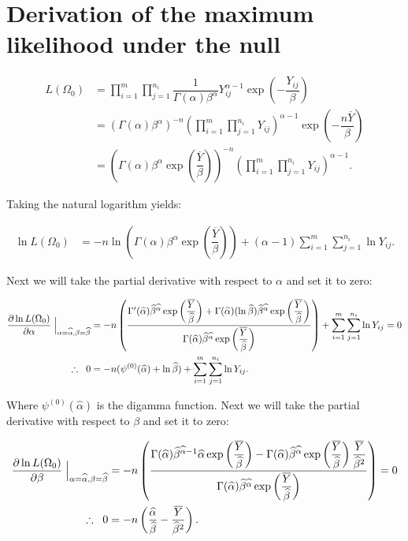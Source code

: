 \documentclass[12pt,a4paper,openright]{article}
\newcommand{\ovY}{\overline{Y}}
\newcommand{\wal}{\widehat{\alpha}}
\newcommand{\wbe}{\widehat{\beta}}
\newcommand{\expy}{\exp\left(\dfrac{\overline{Y}}{\wbe}\right)}
\begin{document}
	\section{Derivation of the maximum likelihood under the null}
	\begin{align}
		L(\Omega_0) &= \prod_{i=1}^m \prod_{j=1}^{n_i} \dfrac{1}{\Gamma(\alpha)\beta^{\alpha}} Y_{ij}^{\alpha-1} \exp{\left(-\dfrac{Y_{ij}}{\beta}\right)} \nonumber \\
		&= (\Gamma(\alpha)\beta^{\alpha})^{-n} \left(\prod_{i=1}^m \prod_{j=1}^{n_i} Y_{ij}\right)^{\alpha-1} \exp{\left(-\dfrac{n\overline{Y}}{\beta}\right)} \nonumber \\
		&= \left(\Gamma(\alpha)\beta^{\alpha}\exp\left(\dfrac{\overline{Y}}{\beta}\right)\right)^{-n} \left(\prod_{i=1}^m \prod_{j=1}^{n_i} Y_{ij}\right)^{\alpha-1}. \label{LikNull}
	\end{align}

	Taking the natural logarithm yields:
	
	\begin{align*}
		\ln{L(\Omega_0)} &= -n\ln{\left(\Gamma(\alpha)\beta^{\alpha}\exp\left(\dfrac{\overline{Y}}{\beta}\right)\right)} + (\alpha-1)\sum_{i=1}^m \sum_{j=1}^{n_i} \ln{Y_{ij}}.
	\end{align*}

	Next we will take the partial derivative with respect to $\alpha$ and set it to zero:
	
	\begin{align}
		\dfrac{\partial \ln{L(\Omega_0)}}{\partial \alpha} \Bigm\lvert_{\alpha=\widehat{\alpha}, \beta=\widehat{\beta}} &= -n \left(\dfrac{\Gamma'(\wal)\wbe^{\wal}\exp\left(\dfrac{\overline{Y}}{\wbe}\right) + \Gamma(\wal)(\ln{\wbe})\wbe^{\wal}\exp\left(\dfrac{\overline{Y}}{\wbe}\right)}{\Gamma(\wal)\wbe^{\wal}\exp\left(\dfrac{\overline{Y}}{\wbe}\right)}\right) + \sum_{i=1}^{m} \sum_{j=1}^{n_i} \ln{Y_{ij}} =0 \nonumber \\
		\therefore\hspace{0.2cm} 0 &= -n(\psi^{(0)}(\wal)+\ln{\wbe}) + \sum_{i=1}^{m} \sum_{j=1}^{n_i} \ln{Y_{ij}}. \label{MLENullAlpha}
	\end{align}

	Where $\psi^{(0)}(\wal)$ is the digamma function. Next we will take the partial derivative with respect to $\beta$ and set it to zero:
	
	\begin{align}
		\dfrac{\partial \ln{L(\Omega_0)}}{\partial \beta}\Bigm \lvert_{\alpha=\widehat{\alpha}, \beta=\widehat{\beta}} &= -n\left(\dfrac{\Gamma(\wal)\wbe^{\wal-1}\wal\expy - \Gamma(\wal)\wbe^{\wal}\expy \dfrac{\overline{Y}}{\wbe^2}}{\Gamma(\wal)\wbe^{\wal}\expy}\right) = 0 \nonumber\\
		\therefore \hspace{0.2cm} 0 &= -n\left(\dfrac{\wal}{\wbe}-\dfrac{\ovY}{\wbe^2}\right). \label{MLENullBeta}
	\end{align}
\end{document}
